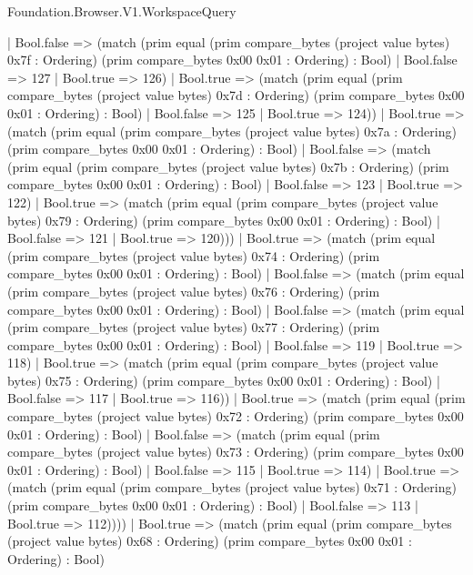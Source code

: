 \begin{lexlean}{Foundation.Browser.V1.WorkspaceQuery}
\begin{semanticmodule}
{                  | Bool.false => (match (prim equal (prim compare_bytes (project value bytes) 0x7f : Ordering) (prim compare_bytes 0x00 0x01 : Ordering) : Bool)
                    | Bool.false => 127
                    | Bool.true => 126)
                  | Bool.true => (match (prim equal (prim compare_bytes (project value bytes) 0x7d : Ordering) (prim compare_bytes 0x00 0x01 : Ordering) : Bool)
                    | Bool.false => 125
                    | Bool.true => 124))
                | Bool.true => (match (prim equal (prim compare_bytes (project value bytes) 0x7a : Ordering) (prim compare_bytes 0x00 0x01 : Ordering) : Bool)
                  | Bool.false => (match (prim equal (prim compare_bytes (project value bytes) 0x7b : Ordering) (prim compare_bytes 0x00 0x01 : Ordering) : Bool)
                    | Bool.false => 123
                    | Bool.true => 122)
                  | Bool.true => (match (prim equal (prim compare_bytes (project value bytes) 0x79 : Ordering) (prim compare_bytes 0x00 0x01 : Ordering) : Bool)
                    | Bool.false => 121
                    | Bool.true => 120)))
              | Bool.true => (match (prim equal (prim compare_bytes (project value bytes) 0x74 : Ordering) (prim compare_bytes 0x00 0x01 : Ordering) : Bool)
                | Bool.false => (match (prim equal (prim compare_bytes (project value bytes) 0x76 : Ordering) (prim compare_bytes 0x00 0x01 : Ordering) : Bool)
                  | Bool.false => (match (prim equal (prim compare_bytes (project value bytes) 0x77 : Ordering) (prim compare_bytes 0x00 0x01 : Ordering) : Bool)
                    | Bool.false => 119
                    | Bool.true => 118)
                  | Bool.true => (match (prim equal (prim compare_bytes (project value bytes) 0x75 : Ordering) (prim compare_bytes 0x00 0x01 : Ordering) : Bool)
                    | Bool.false => 117
                    | Bool.true => 116))
                | Bool.true => (match (prim equal (prim compare_bytes (project value bytes) 0x72 : Ordering) (prim compare_bytes 0x00 0x01 : Ordering) : Bool)
                  | Bool.false => (match (prim equal (prim compare_bytes (project value bytes) 0x73 : Ordering) (prim compare_bytes 0x00 0x01 : Ordering) : Bool)
                    | Bool.false => 115
                    | Bool.true => 114)
                  | Bool.true => (match (prim equal (prim compare_bytes (project value bytes) 0x71 : Ordering) (prim compare_bytes 0x00 0x01 : Ordering) : Bool)
                    | Bool.false => 113
                    | Bool.true => 112))))
            | Bool.true => (match (prim equal (prim compare_bytes (project value bytes) 0x68 : Ordering) (prim compare_bytes 0x00 0x01 : Ordering) : Bool)
}
\end{semanticmodule}
\end{lexlean}

